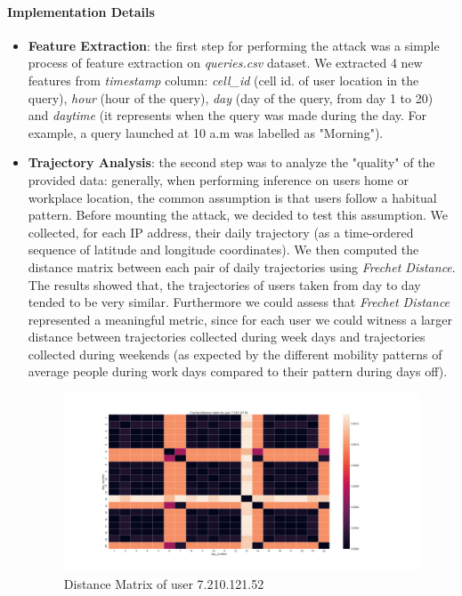 \documentclass[10pt,conference,compsocconf]{IEEEtran}
\begin{document}
\paragraph{Implementation Details}
\begin{itemize}
    \item \textbf{Feature Extraction}: the first step for performing the attack
    was a simple process of feature extraction on     \textit{queries.csv} dataset. We extracted 4 new features from \textit{timestamp} column:
    \textit{cell\_id} (cell id. of user location in the query), \textit{hour} (hour of the query),
    \textit{day} (day of the query, from day 1 to 20) and \textit{daytime}
    (it represents when the query was made during the day. For example, a query launched
    at 10 a.m was labelled as "Morning").

    \item \textbf{Trajectory Analysis}: the second step was to
    analyze the "quality" of the provided data: generally, when performing
    inference on users home or workplace location, the common assumption is that
    users follow a habitual pattern. Before
    mounting the attack, we decided to test this assumption. We collected, for
    each IP address, their daily trajectory (as a time-ordered sequence of
    latitude and longitude coordinates). We then computed the distance matrix
    between each pair of daily trajectories using \textit{Frechet Distance}. The
    results showed that, the trajectories of users taken from day to day tended to be very similar.
    Furthermore we could assess that \textit{Frechet Distance} represented a
    meaningful metric, since for each user we could witness a larger distance
    between trajectories collected during week days and trajectories collected
    during weekends (as expected by the different mobility patterns of average people
    during work days compared to their pattern during days off).


    \begin{figure}[h!]
        \centering
        \includegraphics[width=0.9\linewidth]{../privacy_evaluation/daily_trajectories/7.210.121.52-matrix.png}
        \caption{Distance Matrix of user 7.210.121.52}
        \label{fig:matrix}
    \end{figure}



\end{itemize}
\end{document}
